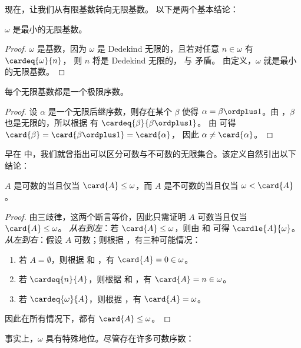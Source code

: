 \documentclass[../../../include/open-logic-section]{subfiles}
\begin{document}
现在，让我们从有限基数转向无限基数。
以下是两个基本结论：

\begin{cor}
$\omega$ 是最小的无限基数。
\end{cor}

\begin{proof}
$\omega$ 是基数，因为 $\omega$ 是 Dedekind 无限的，且若对任意 $n \in \omega$ 有 $\cardeq{\omega}{n}$，
则 $n$ 将是 Dedekind 无限的，
与  矛盾。
由定义，$\omega$ 就是最小的无限基数。
\end{proof}

\begin{cor}
每个无限基数都是一个极限序数。
\end{cor}

\begin{proof}
设 $\alpha$ 是一个无限后继序数，则存在某个 $\beta$ 使得 $\alpha = \beta
\ordplus 1$。由 ，$\beta$
也是无限的，所以根据  有 $\cardeq{\beta}{\beta \ordplus 1}$。
由  可得 $\card{\beta} = \card{\beta\ordplus 1} = \card{\alpha}$，
因此 $\alpha \neq \card{\alpha}$。
\end{proof}

早在  中，我们就曾指出可以区分可数与不可数的无限集合。该定义自然引出以下结论：

\begin{prop}
$A$ 是可数的当且仅当 $\card{A} \leq \omega$，而 $A$ 是不可数的当且仅当 $\omega < \card{A}$。
\end{prop}

\begin{proof}
由三歧律，这两个断言等价，因此只需证明 $A$ 可数当且仅当 $\card{A} \leq \omega$。
\emph{从右到左}：若 $\card{A} \leq \omega$，则由
 和
 可得 $\cardle{A}{\omega}$。
\emph{从左到右}：假设 $A$ 可数；则根据 ，有三种可能情况：
\begin{enumerate}
	\item 若 $A = \emptyset$，则根据  和
	，有 $\card{A} = 0 \in \omega$。
	\item 若 $\cardeq{n}{A}$，则根据  和
	，有 $\card{A} = n \in \omega$。
	\item 若 $\cardeq{\omega}{A}$，则根据 ，有 $\card{A} = \omega$。
\end{enumerate}
因此在所有情况下，都有 $\card{A} \leq \omega$。
\end{proof}
\noindent
事实上，$\omega$ 具有特殊地位。尽管存在许多可数序数：
\end{document}
